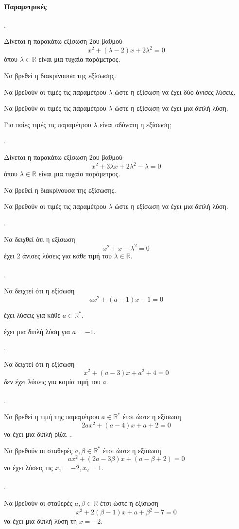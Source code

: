 \documentclass[11pt,a4paper,twocolumn]{article}
\newcounter{askhsh}
\newcommand{\askhsh}{\large\theaskhsh.\ \addtocounter{askhsh}{1}}
\begin{document}
\paragraph{Παραμετρικές}
\askhsh
Δίνεται η παρακάτω εξίσωση 2{ου} βαθμού
\[ x^2+(\lambda-2) x+2\lambda^2=0 \]
όπου $ \lambda\in\mathbb{R} $ είναι μια τυχαία παράμετρος.
\begin{alist}
\item Να βρεθεί η διακρίνουσα της εξίσωσης.
\item Να βρεθούν οι τιμές τις παραμέτρου $ \lambda $ ώστε η εξίσωση να έχει δύο άνισες λύσεις.
\item Να βρεθούν οι τιμές τις παραμέτρου $ \lambda $ ώστε η εξίσωση να έχει μια διπλή λύση.
\item Για ποίες τιμές τις παραμέτρου $ \lambda $ είναι αδύνατη η εξίσωση;
\end{alist}
\askhsh Δίνεται η παρακάτω εξίσωση 2{ου} βαθμού
\[ x^2+3\lambda x+2\lambda^2-\lambda=0 \]
όπου $ \lambda\in\mathbb{R} $ είναι μια τυχαία παράμετρος.
\begin{alist}
\item Να βρεθεί η διακρίνουσα της εξίσωσης.
\item Να βρεθούν οι τιμές τις παραμέτρου $ \lambda $ ώστε η εξίσωση να έχει μια διπλή λύση.
\end{alist}
\askhsh
Να δειχθεί ότι η εξίσωση
\[ x^2+x-\lambda^2=0 \]
έχει 2 άνισες λύσεις για κάθε τιμή του $ \lambda\in\mathbb{R} $.\\\\
\askhsh
Να δειχτεί ότι η εξίσωση
\[ ax^2+(a-1)x-1=0 \]
\begin{alist}
\item έχει λύσεις για κάθε $ a\in\mathbb{R}^* $.
\item έχει μια διπλή λύση για $ a=-1 $.
\end{alist}
\askhsh
Να δειχτεί ότι η εξίσωση
\[ x^2+(a-3) x+a^2+4=0 \]
δεν έχει λύσεις για καμία τιμή του $ a $.\\\\
\askhsh
Να βρεθεί η τιμή της παραμέτρου $ a\in\mathbb{R}^* $ έτσι ώστε η εξίσωση
\[ 2ax^2+(a-4)x+a+2=0 \]
να έχει μια διπλή ρίζα.
\askhsh
Να βρεθούν οι σταθερές $ a,\beta\in\mathbb{R}^* $ έτσι ώστε η εξίσωση
\[ ax^2+(2a-3\beta)x+(a-\beta+2)=0 \] 
να έχει λύσεις τις $ x_1=-2, x_2=1 $.\\\\
\askhsh
Να βρεθούν οι σταθερές $ a, \beta\in\mathbb{R} $ έτσι ώστε η εξίσωση
 \[ x^2+2(\beta-1)x+a+\beta^2-7=0 \] 
 να έχει μια διπλή λύση τη $ x=-2$.\\\\
\end{document}
